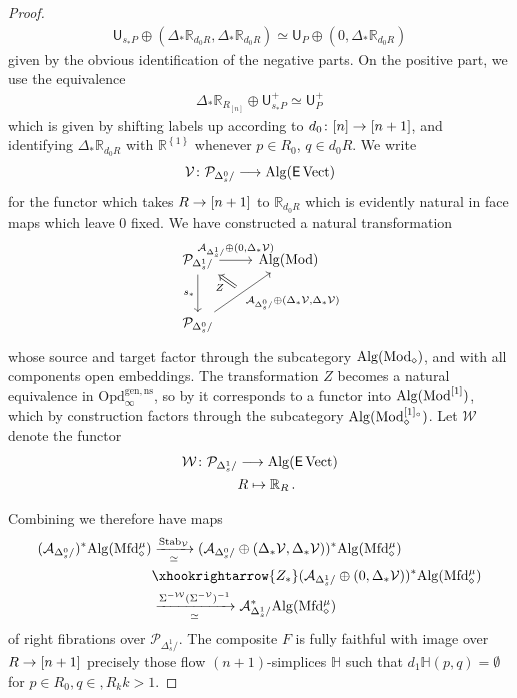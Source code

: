 \documentclass[10pt]{amsart}
\numberwithin{equation}{section}
\theoremstyle{definition}
\DeclareMathOperator{\Mod}{Mod}
\DeclareMathOperator{\Stab}{Stab}
\DeclareMathOperator{\Vect}{Vect}
\newcommand{\Mfd}{\mathrm{Mfd}\vphantom{d}}
\newcommand{\Alg}{\mathrm{Alg}\vphantom{z}}
\newcommand{\bH}{\mathbb{H}}
\newcommand{\bR}{\mathbb{R}}
\newcommand{\cA}{\mathcal{A}}
\newcommand{\cP}{\mathcal{P}}
\newcommand{\cV}{\mathcal{V}}
\newcommand{\cW}{\mathcal{W}}
\newcommand{\sfE}{\mathsf{E}}
\newcommand{\sfU}{\mathsf{U}}
\newcommand{\Opd}{\mathrm{Opd}^{\mathrm{gen,ns}}_{\infty}}
\renewcommand{\to}{\mathchoice{\longrightarrow}{\rightarrow}{}{}}
\begin{document}
\begin{proof}
\begin{align*}
		\sfU_{s_{*}P} \oplus (\Delta_{*}\bR_{d_{0}R}, \Delta_{*}\bR_{d_{0}R} ) \simeq \sfU_{P} \oplus (0, \Delta_{*}\bR_{d_{0}R})
	\end{align*}
	given by the obvious identification of the negative parts.
  On the positive part, we use the equivalence
	\begin{align*}
		\Delta_{*}\bR_{R_{[n]}} \oplus \sfU^{+}_{s_{*}P} \simeq \sfU^{+}_{P}
	\end{align*}
	which is given by shifting labels up according to $d_{0}\colon [n]\to [n+1]$, and identifying $\Delta_{*}\bR_{d_{0}R}$ with $\bR^{ \left\{ 1\right\}}$ whenever $p\in R_{0}$, $q\in d_{0}R$.
  We write
	\begin{align*}
		\cV \colon \cP_{\Delta^{0}_{s}/} \to \Alg(\sfE\Vect )
	\end{align*}
	for the functor which takes $R\to [n+1]$ to $\bR_{d_{0}R}$ which is evidently natural in face maps which leave $0$ fixed.
  We have constructed a natural transformation
	\begin{equation*}
	\begin{tikzcd}[row sep=large]
		\cP_{\Delta^{1}_{s}/} \arrow[r, "{\cA_{\Delta^{1}_{s}/} \oplus (0, \Delta_{*}\cV )}"] \arrow[d, "s_{*}"']      &   \Alg(\Mod) \\
		\cP_{\Delta^{0}_{s}/}  \arrow[ur, "{\cA_{\Delta^{0}_{s}/} \oplus (\Delta_{*}\cV, \Delta_{*}\cV)}"' , ""{name=S} ]
		\arrow[from=S, to=1-1, Rightarrow, "Z"]
	\end{tikzcd}
    \end{equation*}
	whose source and target factor through the subcategory $\Alg(\Mod_{\diamond})$, and with all components open embeddings.
  The transformation $Z$ becomes a natural equivalence in $\Opd$, so by  it corresponds to a functor into $\Alg(\Mod^{[1]})$, which by construction factors through the subcategory $\Alg(\Mod_{\diamond}^{[1]_{\circ}})$.
  Let $\cW$ denote the functor
	\begin{align*}
		\cW \colon \cP_{\Delta^{1}_{s}/} &\to \Alg(\sfE\Vect) \\
		& R \mapsto \bR_{R} \,.
	\end{align*}

	Combining  we therefore have maps
	\begin{align*}
		(\cA_{\Delta^{0}_{s}/} )^{*}\Alg(\Mfd^{\mu}_{\diamond}) &\xrightarrow[\simeq]{\Stab_{\cV}} (\cA_{\Delta^{0}_{s}/} \oplus (\Delta_{*}\cV,\Delta_{*}\cV  ))^{*}\Alg(\Mfd^{\mu}_{\diamond}) \\
		&\xhookrightarrow{Z_{*}} (\cA_{\Delta^{1}_{s}/}\oplus (0,\Delta_{*}\cV)  )^{*}\Alg(\Mfd_{\diamond}^{\mu}) \\
		&\xrightarrow[\simeq]{\Sigma^{-\cW} (\Sigma^{-\cV})^{-1}} \cA_{\Delta^{1}_{s}/}^{*}\Alg(\Mfd_{\diamond}^{\mu})
	\end{align*}
  of right fibrations over $\cP_{\Delta^{1}_{s}/}$.
	The composite $F$ is fully faithful with image over $R\to [n+1]$ precisely those flow $(n+1)$-simplices $\bH$ such that $d_{1}\bH(p,q) = \emptyset$ for $p\in R_{0}, q\in, R_{k} k>1$.


\end{proof}
\end{document}
